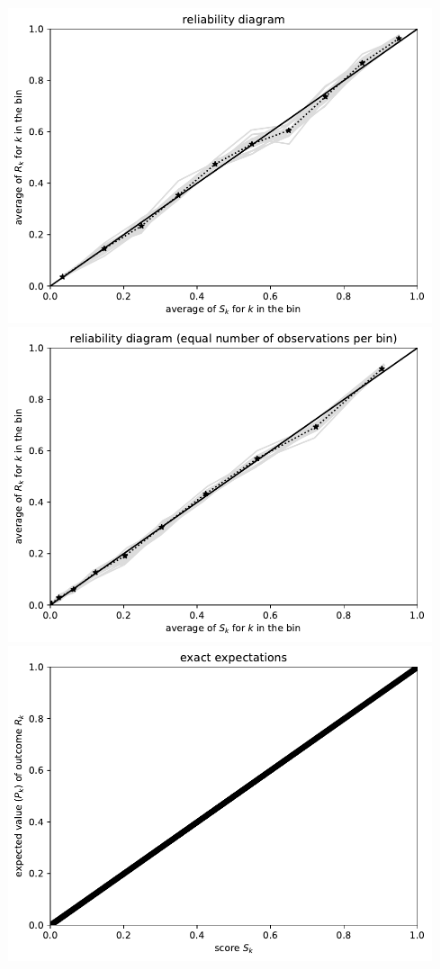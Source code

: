 \documentclass{article}
\begin{document}
\begin{figure}
\begin{centering}
\parbox{\imsize}{\includegraphics[width=\imsize]
                {./codes/unweighted/10000_10_1_3/equiprob.pdf}}
\quad\quad
\parbox{\imsize}{\includegraphics[width=\imsize]
                {./codes/unweighted/10000_10_1_3/equisamp.pdf}}

\vspace{\vertsep}

\parbox{\imsize}{\includegraphics[width=\imsize]
                {./codes/unweighted/10000_10_1_3/exact.pdf}}


\end{centering}
\end{figure}
\end{document}
